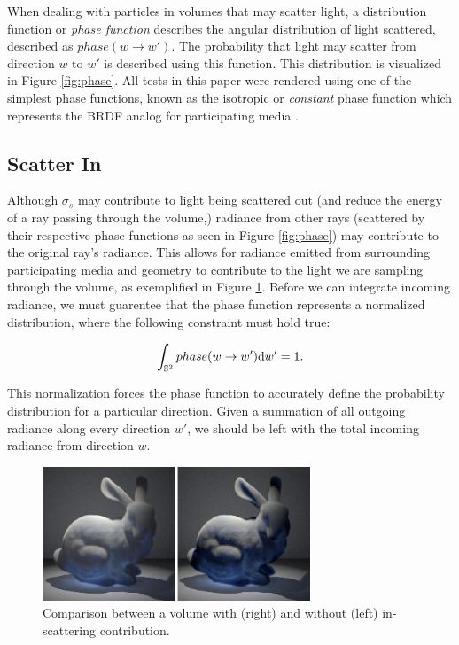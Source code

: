 When dealing with particles in volumes that may scatter light, a distribution function or \textit{phase function} describes the angular distribution of light scattered, described as $phase(w \to w')$.  The probability that light may scatter from direction $w$ to $w'$ is described using this function.  This distribution is visualized in Figure \ref{fig:phase}. All tests in this paper were rendered using one of the simplest phase functions, known as the isotropic or \textit{constant} phase function which represents the BRDF analog for participating media \cite{cerezo}.


\subsection{Scatter In}
Although $\sigma_{s}$ may contribute to light being scattered out (and reduce the energy of a ray passing through the volume,) radiance from other rays (scattered by their respective phase functions as seen in Figure \ref{fig:phase}) may contribute to the original ray's radiance.  This allows for radiance emitted from surrounding participating media and geometry to contribute to the light we are sampling through the volume, as exemplified in Figure \ref{fig:inscat_comp}.  Before we can integrate incoming radiance, we must guarentee that the phase function represents a normalized distribution, where the following constraint must hold true:

\begin{equation}
\int_{\mathbb{S}^2}phase(w \to w')\textup{d}w' = 1.
\label{eq:source}
\end{equation}

This normalization forces the phase function to accurately define the probability distribution for a particular direction.  Given a summation of all outgoing radiance along every direction $w'$, we should be left with the total incoming radiance from direction $w$.

\begin{figure}[h!]
    \centering
    \includegraphics[width=80mm]{../img/inscat_comp.png}
    \captionfonts
    \caption{Comparison between a volume with (right) and without (left) in-scattering contribution.}
    \label{fig:inscat_comp}
\end{figure}

